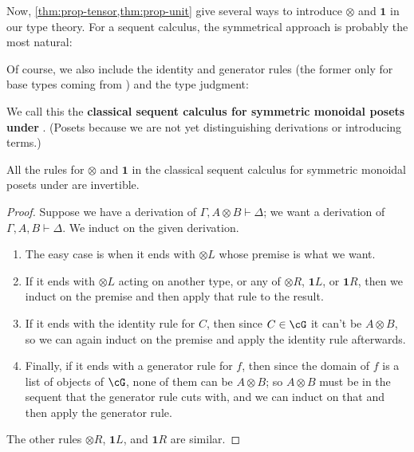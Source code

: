 \documentclass{book}
\let\types\vdash
\def\type{\;\ftype}
\def\unit{\mathbf{1}}
\def\one{\mathbf{1}}
\let\tensor\otimes
\def\tensorL{\mathord{\tensor}L}
\def\tensorR{\mathord{\tensor}R}
\begin{document}
Now, \cref{thm:prop-tensor,thm:prop-unit} give several ways to introduce $\tensor$ and $\unit$ in our type theory.
For a sequent calculus, the symmetrical approach is probably the most natural:
Of course, we also include the identity and generator rules (the former only for base types coming from \cG) and the type judgment:
We call this the \textbf{classical sequent calculus for symmetric monoidal posets under \cG}.
(Posets because we are not yet distinguishing derivations or introducing terms.)

\begin{thm}\label{thm:seqcalc-smpos-invertible}
  All the rules for $\tensor$ and $\one$ in the classical sequent calculus for symmetric monoidal posets under \cG are invertible.
\end{thm}
\begin{proof}
  Suppose we have a derivation of $\Gamma,A\tensor B\types \Delta$; we want a derivation of $\Gamma,A,B\types \Delta$.
  We induct on the given derivation.
  \begin{enumerate}
  \item The easy case is when it ends with $\tensorL$ whose premise is what we want.
  \item If it ends with $\tensorL$ acting on another type, or any of $\tensorR$, $\one L$, or $\one R$, then we induct on the premise and then apply that rule to the result.
  \item If it ends with the identity rule for $C$, then since $C\in \cG$ it can't be $A\tensor B$, so we can again induct on the premise and apply the identity rule afterwards.
  \item Finally, if it ends with a generator rule for $f$, then since the domain of $f$ is a list of objects of $\cG$, none of them can be $A\tensor B$; so $A\tensor B$ must be in the sequent that the generator rule cuts with, and we can induct on that and then apply the generator rule.
  \end{enumerate}
  The other rules $\tensorR$, $\one L$, and $\one R$ are similar.
\end{proof}
\end{document}
